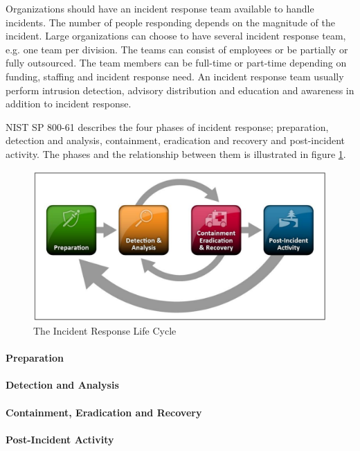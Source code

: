 Organizations should have an incident response team available to handle incidents. The number of people responding depends on the magnitude of the incident. Large organizations can choose to have several incident response team, e.g. one team per division. The teams can consist of employees or be partially or fully outsourced. The team members can be full-time or part-time depending on funding, staffing and incident response need.  %
An incident response team usually perform intrusion detection, advisory distribution and education and awareness in addition to incident response.

\acs{NIST} SP 800-61 describes the four phases of incident response; preparation, detection and analysis, containment, eradication and recovery and post-incident activity. The phases and the relationship between them is illustrated in figure \ref{fig:NISTIncidentResponse}.

\begin{figure}[H]
\begin{center}
\includegraphics[scale=0.27]{NISTIncidentResponseCycle.png}
\caption[The Incident Response Life Cycle]{The Incident Response Life Cycle \cite{nist800-61}}
\label{fig:NISTIncidentResponse}
\end{center}
\end{figure}

\paragraph{Preparation} 

\paragraph{Detection and Analysis}

\paragraph{Containment, Eradication and Recovery}

\paragraph{Post-Incident Activity}


